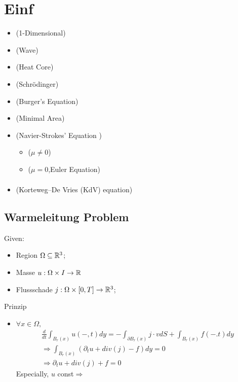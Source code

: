 \documentclass[Total.tex]{subfiles}
\begin{document}
	\chapter{Einf}
		\begin{itemize}
			\item (1-Dimensional)
			\item (Wave)
			 \item (Heat Core)
			\item (Schr\"odinger)
			\item (Burger's Equation)
			\item (Minimal Area)
			\item (Navier-Strokes' Equation )
			\begin{itemize}
				\item ($\mu\not=0$)
				\item ($\mu=0$,Euler Equation) 
				\begin{gather*}
				\end{gather*}
			\end{itemize}
			\item (Korteweg–De Vries (KdV) equation)
		\end{itemize}
		\section{Warmeleitung Problem}
			Given:
			\begin{itemize}
				\item Region $\Omega\subseteq \mathbb{R}^3$;
				\item Masse $u:\Omega\times I\rightarrow \mathbb{R}$
				\item Flussschade $j:\Omega\times [0,T]\rightarrow \mathbb{R}^3$;
			\end{itemize}
			Prinzip
			\begin{itemize}
				\item $\forall x\in \Omega,$
				\begin{gather*}
					\frac{d}{dt}\int_{B_r(x)} u(-,t)dy=-\int_{\partial B_r(x)} j\cdot v dS+\int_{B_r(x)} f(-.t)dy\\
					\Rightarrow \int_{B_r(x)} (\partial_t u+div (j)-f)dy=0\\
					\Rightarrow \partial_t u+div(j)+f=0
				\end{gather*}
				Especially, $u$ const$\Rightarrow $ 
			\end{itemize}
\end{document}
